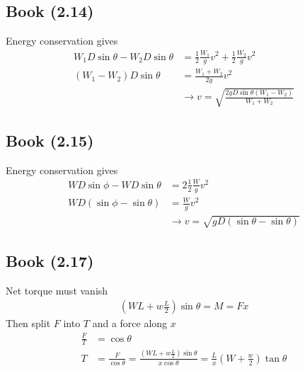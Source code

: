 \documentclass[../main.tex]{subfiles}
\begin{document}
\subsection{Book (2.14)}
Energy conservation gives
\begin{align}
W_1D\sin\theta-W_2D\sin\theta&=\frac{1}{2}\frac{W_1}{g}v^2+\frac{1}{2}\frac{W_2}{g}v^2\\
(W_1-W_2)D\sin\theta&=\frac{W_1+W_2}{2g}v^2\\
&\rightarrow v=\sqrt{\frac{2gD\sin\theta(W_1-W_2)}{W_1+W_2}}
\end{align}

\subsection{Book (2.15)}
Energy conservation gives
\begin{align}
WD\sin\phi-WD\sin\theta&=2\frac{1}{2}\frac{W}{g}v^2\\
WD(\sin\phi-\sin\theta)&=\frac{W}{g}v^2\\
&\rightarrow v=\sqrt{gD(\sin\theta-\sin\theta)}
\end{align}

\subsection{Book (2.17)}
Net torque must vanish 
\begin{align}
\left(WL+w\frac{L}{2}\right)\sin\theta=M=Fx
\end{align}
Then split $F$ into $T$ and a force along $x$
\begin{align}
\frac{F}{T}&=\cos\theta\\
T&=\frac{F}{\cos\theta}=\frac{\left(WL+w\frac{L}{2}\right)\sin\theta}{x \cos\theta}=\frac{L}{x}\left(W+\frac{w}{2}\right)\tan\theta
\end{align}
\end{document}
